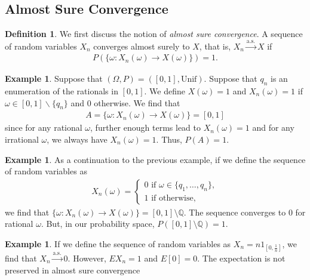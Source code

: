 \documentclass[15pt,a4paper]{book}
\theoremstyle{definition}
\newtheorem{definition}[theorem]{Definition}
\newtheorem{example}[theorem]{Example}
\newcommand{\eax}[1]{\emph{#1}\index{#1}} %
\newcommand{\toup}[1]{\xrightarrow{#1}}
\begin{document}
\subsection{Almost Sure Convergence}

\begin{definition}
    We first discuss the notion of \eax{almost sure convergence}. A sequence of random variables $X_{n}$ converges almost surely to $X$, that is, $X_{n} \toup{\text{a.s.}} X$ if
    \begin{align*}
        P(\{\omega: X_{n}(\omega) \to X(\omega)\}) = 1.
    \end{align*}
\end{definition}

\begin{example}
    Suppose that $(\Omega,P) = ([0,1],\text{Unif})$. Suppose that $q_{n}$ is an enumeration of the rationals in $[0,1]$. We define $X(\omega) = 1$ and $X_{n}(\omega) = 1$ if $\omega \in [0,1]\backslash\{q_{n}\}$ and $0$ otherwise. We find that
    \begin{align}
        A = \{\omega: X_{n}(\omega) \to X(\omega)\} = [0,1]
    \end{align}
    since for any rational $\omega$, further enough terms lead to $X_{n}(\omega) = 1$ and for any irrational $\omega$, we always have $X_{n}(\omega) = 1$. Thus, $P(A) = 1$.
\end{example}
\begin{example}
    As a continuation to the previous example, if we define the sequence of random variables as
    \begin{align}
        X_{n}(\omega) = \begin{cases}
            0 \text{ if } \omega \in \{q_{1},\ldots,q_{n}\},\\
            1 \text{ if otherwise},
        \end{cases}
    \end{align}
    we find that $\{\omega : X_{n}(\omega) \to X(\omega)\} = [0,1]\setminus \mathbb{Q}$. The sequence converges to 0 for rational $\omega$. But, in our probability space, $P([0,1]\setminus \mathbb{Q}) = 1$.
\end{example}

\begin{example}
    If we define the sequence of random variables as $X_{n} = n 1_{[0,\frac{1}{n}]}$, we find that $X_{n} \toup{\text{a.s.}} 0$. However, $EX_{n} = 1$ and $E[0] = 0$. The expectation is not preserved in almost sure convergence
\end{example}
\end{document}

